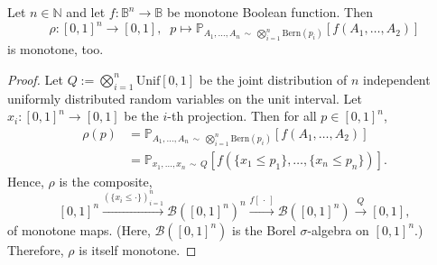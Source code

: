 \documentclass[10pt,a4paper]{amsart}
\begin{document}
\begin{lemma}\label{lemma:monotonicity}
    Let $n\in \mathbb{N}$ and let $f: \mathbb{B}^n \to \mathbb{B}$ be monotone Boolean function.
    Then 
        $$ \rho : [0,1]^n \to [0,1], \;\; p \mapsto \mathbb{P}_{A_1,\dots, A_n \,\sim\, \bigotimes_{i=1}^n \mathrm{Bern}(p_i)}[f(A_1, \dots, A_2)] $$
    is monotone, too.
\end{lemma}

\begin{proof}
    Let $Q:= \bigotimes_{i=1}^{n} \mathrm{Unif}[0,1]$ 
    be the joint distribution of $n$ independent uniformly distributed
    random variables on the unit interval. 
    Let $x_i: [0,1]^n \to [0,1]$ be the $i$-th projection.
    Then for all $p\in [0,1]^n$,
    \begin{align*}
        \rho(p) &= \mathbb{P}_{A_1,\dots, A_n \,\sim\, \bigotimes_{i=1}^n \mathrm{Bern}(p_i)}[f(A_1, \dots, A_2)]\\
                &= \mathbb{P}_{x_1,\dots, x_n \,\sim\, Q}[f(\{x_1 \leq p_1\}, \dots, \{x_n \leq p_n\})].
    \end{align*}
    Hence, $\rho$ is the composite, 
        $$ [0,1]^n \xrightarrow{(\{x_i \leq \cdot\})_{i=1}^n} \mathcal{B}([0,1]^n)^n \xrightarrow{f[\,\cdot\,]} \mathcal{B}([0,1]^n) \xrightarrow{Q} [0,1],$$
    of monotone maps. 
    (Here, $\mathcal{B}([0,1]^n)$ is the Borel $\sigma$-algebra on $[0,1]^n$.) 
    Therefore, $\rho$ is itself monotone. 
\end{proof}
\end{document}

